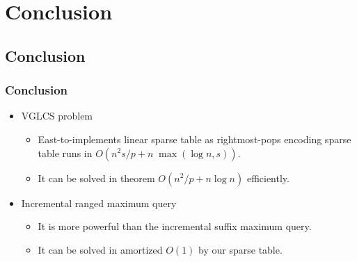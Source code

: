 \section{Conclusion}

\subsection{Conclusion}
\begin{frame}
    \frametitle{Conclusion}
    \begin{itemize}
    	\setlength\itemsep{1em}
    	\item
    		VGLCS problem
    		\begin{itemize}
    			\setlength\itemsep{1em}
    			\item 
                    East-to-implements linear sparse table as
                    rightmost-pops encoding sparse table runs in $O(n^2
                    s/p+n\;\max(\log n, s))$.
				\item
					It can be solved in theorem $O(n^2/p+n\log n)$
		    		efficiently.
    		\end{itemize}
    	\item
    		Incremental ranged maximum query
    		\begin{itemize}
    			\setlength\itemsep{1em}
    			\item
    				It is more powerful than the incremental suffix
					maximum query.
				\item
					It can be solved in amortized $O(1)$ by our sparse
					table.
    		\end{itemize}
    \end{itemize}
\end{frame}